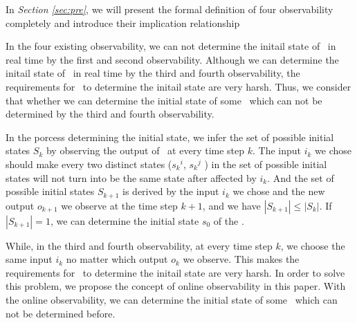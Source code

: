 

In {\em Section \ref{sec:pre}}, we will present the formal definition of four observability completely and introduce their implication relationship%

In the four existing observability, we can not determine the initail state of \BCNs\ in real time by the first and second observability. Although we can determine the initail state of \BCNs\ in real time by the third and fourth observability, the requirements for \BCNs\ to determine the initail state are very harsh. Thus, we consider that whether we can determine the initial state of some \BCNs\ which can not be determined by the third and fourth observability.

In the porcess determining the initial state, we infer the set of possible initial states $S_k$ by observing the output of \BCN\ at every time step $k$. The input $i_k$ we chose should make every two distinct states (${s_k}^i$, ${s_k}^j$ ) in the set of possible initial states will not turn into be the same state after affected by $i_k$. And the set of possible initial states $S_{k+1}$ is derived by the input $i_k$ we chose and the new output $o_{k+1}$ we observe at the time step $k+1$, and we have $|S_{k+1}|\le|S_k|$. If $|S_{k+1}|=1$, we can determine the initial state $s_0$ of the \BCN.

While, in the third and fourth observability, at every time step $k$, we choose the same input $i_k$ no matter which output $o_k$ we observe. This makes the requirements for \BCNs\ to determine the initail state are very harsh. In order to solve this problem, we propose the concept of online observability in this paper. With the online observability, we can determine the initial state of some \BCNs\ which can not be determined before.


